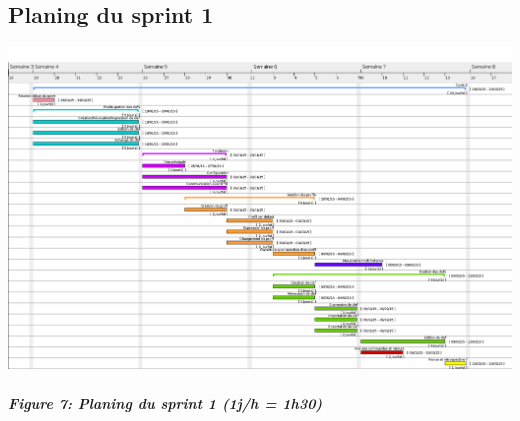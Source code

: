 \documentclass{../res/univ-projet}
\begin{document}
\subsection{Planing du sprint 1}
\begin{center}
\includegraphics[angle=90,scale=0.385]{./graphics/Planing_sprint_1} \\~\\
\textbf{\textit{Figure 7: Planing du sprint 1 (1j/h = 1h30)}}
\end{center}
\end{document}
